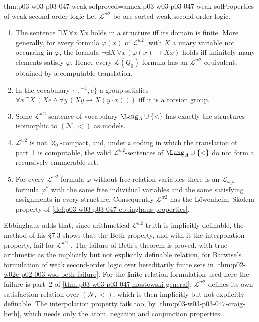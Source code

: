 \begin{hbtheorem}{thm:p03-w03-p03-047-weak-sol}{proved=annex:p03-w03-p03-047-weak-sol}{Properties of weak second-order logic}
Let \(\mathscr L^{w2}\) be one-sorted weak second-order logic.
\begin{enumerate}
 \item The sentence \(\exists X\,\forall x\,Xx\) holds in a structure iff
       its domain is finite.  More generally, for every formula
       \(\varphi(x)\) of \(\mathscr L^{w2}\), with \(X\) a unary variable not
       occurring in \(\varphi\), the formula
       \(\neg\exists X\,\forall x\,(\varphi(x)\to Xx)\) holds iff infinitely
       many elements satisfy \(\varphi\).  Hence every
       \(\mathscr L(Q_0)\)-formula has an \(\mathscr L^{w2}\)-equivalent,
       obtained by a computable translation.
 \item In the vocabulary \(\{\cdot,{}^{-1},e\}\) a group satisfies
       \(\forall x\,\exists X\,(Xe\land\forall y\,(Xy\to X(y\cdot x)))\) iff
       it is a torsion group.
 \item Some \(\mathscr L^{w2}\)-sentence of vocabulary \(\Lang_A\cup\{<\}\)
       has exactly the structures isomorphic to \((\mathcal N,<)\) as models.
 \item \(\mathscr L^{w2}\) is not \(\aleph_0\)-compact, and, under a coding
       in which the translation of part~1 is computable, the valid
       \(\mathscr L^{w2}\)-sentences of \(\Lang_A\cup\{<\}\) do not form a
       recursively enumerable set.
 \item For every \(\mathscr L^{w2}\)-formula \(\varphi\) without free
       relation variables there is an \(\mathscr L_{\omega_1\omega}\)-formula
       \(\varphi^\ast\) with the same free individual variables and the same
       satisfying assignments in every structure.  Consequently
       \(\mathscr L^{w2}\) has the L\"owenheim--Skolem property of
       \cref{def:p03-w03-p03-047-ebbinghaus-properties}.
\end{enumerate}
\end{hbtheorem}

Ebbinghaus adds that, since arithmetical \(\mathscr L^{w2}\)-truth is
implicitly definable, the method of his \S7.3 shows that the Beth property,
and with it the interpolation property, fail for \(\mathscr L^{w2}\)
\cite[Ch.~II, \S2.1, p.~34]{Ebbinghaus1985ExtendedLogics}.  The failure of
Beth's theorem is proved, with true arithmetic as the implicitly but not
explicitly definable relation, for Barwise's formulation of weak
second-order logic over hereditarily finite sets in
\cref{thm:p02-w02c-p02-003-wso-beth-failure}.  For the finite-relation
formulation used here the failure is part~2 of
\cref{thm:p03-w03-p03-047-mostowski-general}: \(\mathscr L^{w2}\) defines its
own satisfaction relation over \((\mathcal N,<)\), which is then implicitly
but not explicitly definable.  The interpolation property fails too, by
\cref{thm:p03-w03-p03-047-craig-beth}, which needs only the atom, negation
and conjunction properties.

